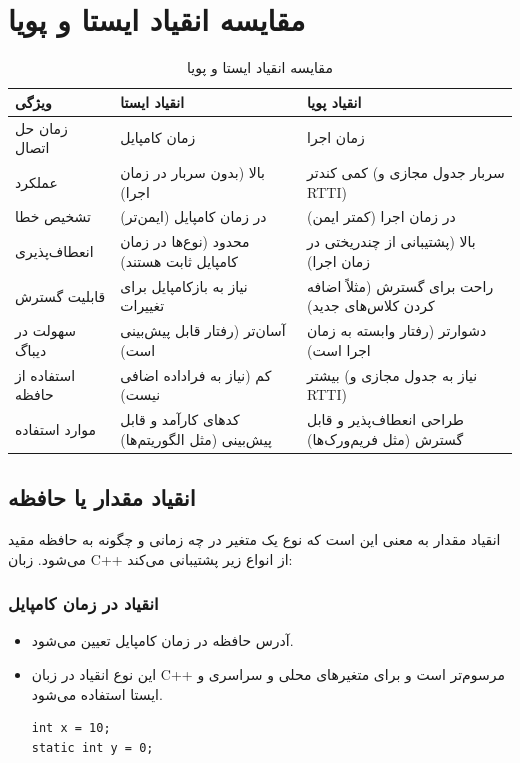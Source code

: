 \documentclass{article}
\begin{document}
\section*{مقایسه انقیاد ایستا و پویا}

\begin{table}[h!]
    \centering
    \begin{tabular}{|p{3cm}|p{5cm}|p{5cm}|}
        \hline
        \textbf{ویژگی} & \textbf{انقیاد ایستا} & \textbf{انقیاد پویا} \\
        \hline
        زمان حل اتصال & زمان کامپایل & زمان اجرا \\
        \hline
        عملکرد & بالا (بدون سربار در زمان اجرا) & کمی کندتر (سربار جدول مجازی و RTTI) \\
        \hline
        تشخیص خطا & در زمان کامپایل (ایمن‌تر) & در زمان اجرا (کمتر ایمن) \\
        \hline
        انعطاف‌پذیری & محدود (نوع‌ها در زمان کامپایل ثابت هستند) & بالا (پشتیبانی از چندریختی در زمان اجرا) \\
        \hline
        قابلیت گسترش & نیاز به بازکامپایل برای تغییرات & راحت برای گسترش (مثلاً اضافه کردن کلاس‌های جدید) \\
        \hline
        سهولت در دیباگ & آسان‌تر (رفتار قابل پیش‌بینی است) & دشوارتر (رفتار وابسته به زمان اجرا است) \\
        \hline
        استفاده از حافظه & کم (نیاز به فراداده اضافی نیست) & بیشتر (نیاز به جدول مجازی و RTTI) \\
        \hline
        موارد استفاده & کدهای کارآمد و قابل پیش‌بینی (مثل الگوریتم‌ها) & طراحی انعطاف‌پذیر و قابل گسترش (مثل فریم‌ورک‌ها) \\
        \hline
    \end{tabular}
    \caption{مقایسه انقیاد ایستا و پویا}
    \label{tab:static_dynamic_binding}
\end{table}

\subsection*{انقیاد مقدار یا حافظه}
انقیاد مقدار به معنی این است که نوع یک متغیر در چه زمانی و چگونه به حافظه مقید می‌‌شود. 
زبان C++ از انواع زیر پشتیبانی می‌کند:


\subsubsection*{انقیاد در زمان کامپایل}
\begin{itemize}
    \item آدرس حافظه در زمان کامپایل تعیین می‌شود.
    \item این نوع انقیاد در زبان C++ مرسوم‌‌تر است و برای متغیر‌های محلی و سراسری و ایستا استفاده می‌شود.

\begin{LTR} %
\begin{lstlisting}
int x = 10;
static int y = 0;
\end{lstlisting}
\end{LTR}
\end{itemize}
\end{document}
